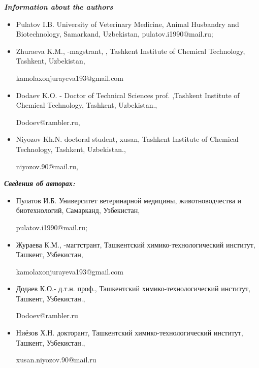 \emph{{\bfseries Information about the authors}}

\begin{itemize}
\item
Pulatov I.B. University of Veterinary Medicine, Animal Husbandry and
Biotechnology, Samarkand, Uzbekistan, pulatov.i1990@mail.ru;

\item
Zhuraeva K.M., -magstrant, , Tashkent Institute of Chemical Technology,
Tashkent, Uzbekistan,

kamolaxonjurayeva193@gmail.com

\item
Dodaev K.O. - Doctor of Technical Sciences prof. ,Tashkent Institute of
Chemical Technology, Tashkent, Uzbekistan.,

Dodoev@rambler.ru,

\item
Niyozov Kh.N. doctoral student, xusan, Tashkent Institute of Chemical
Technology, Tashkent, Uzbekistan.,

niyozov.90@mail.ru,
\end{itemize}

\emph{{\bfseries Сведения об авторах:}}

\begin{itemize}
\item
Пулатов И.Б. Университет ветеринарной медицины, животноводчества и
биотехнологий, Самарканд, Узбекистан,

pulatov.i1990@mail.ru;

\item
Жураева К.М., -магтстрант, Ташкентский химико-технологический институт,
Ташкент, Узбекистан,

kamolaxonjurayeva193@gmail.com

\item
Додаев К.О.- д.т.н. проф., Ташкентский химико-технологический институт,
Ташкент, Узбекистан.,

Dodoev@rambler.ru

\item
Ниёзов Х.Н. докторант, Ташкентский химико-технологический институт,
Ташкент, Узбекистан.,

xusan.niyozov.90@mail.ru
\end{itemize}
